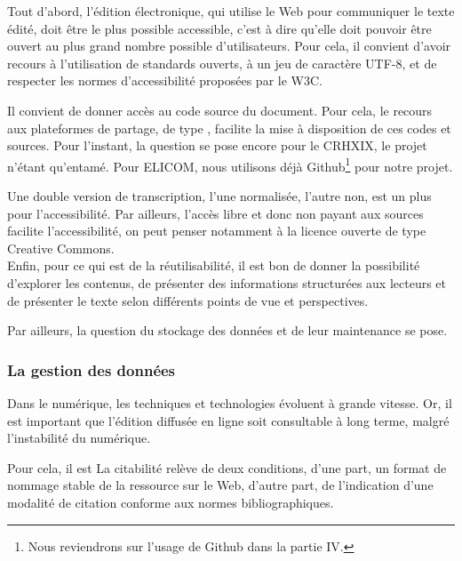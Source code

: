 Tout d'abord, l'édition électronique, qui utilise le Web pour communiquer le texte édité, doit être le plus possible accessible, c'est à dire qu'elle doit pouvoir être ouvert au plus grand nombre possible d'utilisateurs. Pour cela, il convient d'avoir recours à l'utilisation de standards ouverts, à un jeu de caractère UTF-8, et de respecter les normes d'accessibilité proposées par le W3C. 

Il convient de donner accès au code source du document. Pour cela, le recours aux plateformes de partage, de type , facilite la mise à disposition de ces codes et sources. Pour l'instant, la question se pose encore pour le CRHXIX, le projet n'étant qu'entamé. Pour ELICOM, nous utilisons déjà Github\footnote{Nous reviendrons sur l'usage de Github dans la partie IV.} pour notre projet.

Une double version de transcription, l'une normalisée, l'autre non, est un plus pour l'accessibilité. Par ailleurs, l'accès libre et donc non payant aux sources facilite l'accessibilité, on peut penser notamment à la licence ouverte de type Creative Commons.\\

Enfin, pour ce qui est de la réutilisabilité, il est bon de donner la possibilité d'explorer les contenus, de présenter des informations structurées aux lecteurs et de présenter le texte selon différents points de vue et perspectives.

 Par ailleurs, la question du stockage des données et de leur maintenance se pose.

\subsubsection{La gestion des données}

Dans le numérique, les techniques et technologies évoluent à grande vitesse. Or, il est important que l'édition diffusée en ligne soit consultable à long terme, malgré l'instabilité du numérique. 

Pour cela, il est   La citabilité relève de deux conditions, d'une part, un format de nommage stable de la ressource sur le Web, d'autre part, de l'indication d'une modalité de citation conforme aux normes bibliographiques.

